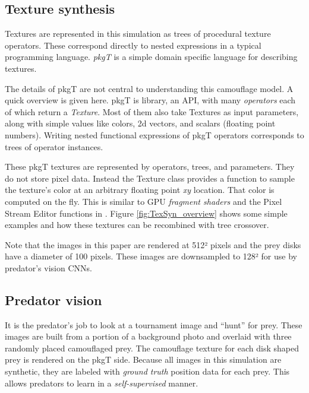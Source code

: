 \documentclass[acmtog]{acmart}
\newcommand{\jargon}[1]{\textit{#1}}
\newcommand{\texsyn}[0]{pkgT}
\begin{document}
\subsection{Texture synthesis}
\label{subsec:texture_synthesis}
Textures are represented in this simulation as trees of procedural texture operators. These correspond directly to nested expressions in a typical programming language. \jargon{\texsyn{}} is a simple domain specific language for describing textures.
\par
The details of \texsyn{} are not central to understanding this camouflage model. A quick overview is given here. \texsyn{} is library, an API, with many \jargon{operators} each of which return a \jargon{Texture}. Most of them also take Textures as input parameters, along with simple values like colors, 2d vectors, and scalars (floating point numbers). Writing nested functional expressions of \texsyn{} operators corresponds to trees of operator instances.
\par
These \texsyn{} textures are represented by operators, trees, and parameters. They do not store pixel data. Instead the Texture class provides a function to sample the texture's color at an arbitrary floating point \textit{xy} location. That color is computed on the fly. This is similar to GPU \jargon{fragment shaders} and the Pixel Stream Editor functions in \citet{perlin_image_1985}. Figure \ref{fig:TexSyn_overview} shows some simple examples and how these textures can be recombined with tree crossover.
\par
Note that the images in this paper are rendered at 512² pixels and the prey disks have a diameter of 100 pixels. These images are downsampled to 128² for use by predator's vision CNNs.
\par


\subsection{Predator vision}
It is the predator's job to look at a tournament image and “hunt” for prey. These images are built from a portion of a background photo and overlaid with three randomly placed camouflaged prey. The camouflage texture for each disk shaped prey is rendered on the \texsyn{} side. Because all images in this simulation are synthetic, they are labeled with \jargon{ground truth} position data for each prey. This allows predators to learn in a \jargon{self-supervised} manner.
\par
\end{document}
